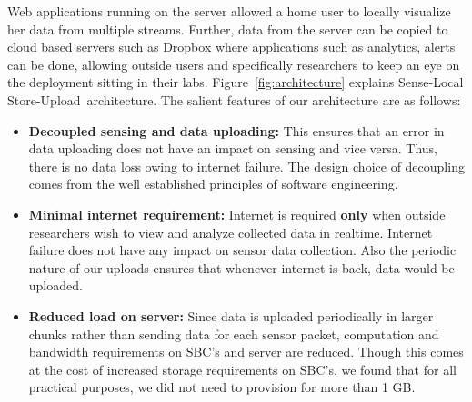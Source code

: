 \documentclass[10pt]{sensys-proc}
\newcommand{\figref}[1]{Figure~\ref{#1}}
\newcommand{\paradigms}{Sense-Local Store-Upload~}
\begin{document}
Web applications running on the server allowed a home user to locally visualize her data from multiple streams. Further, data from the server can be copied to cloud based servers such as Dropbox where applications such as analytics, alerts can be done, allowing outside users and specifically researchers to keep an eye on the deployment sitting in their labs. \figref{fig:architecture} explains \paradigms architecture. The salient features of our architecture are as follows:
\begin{itemize}
\item \textbf{Decoupled sensing and data uploading:} This ensures that an error in data uploading does not have an impact on sensing and vice versa. Thus, there is no data loss owing to internet failure. The design choice of decoupling comes from the well established principles of software engineering.
\item \textbf{Minimal internet requirement:} Internet is required \textbf{only} when outside researchers wish to view and analyze collected data in realtime. Internet failure does not have any impact on sensor data collection. Also the periodic nature of our uploads ensures that whenever internet is back, data would be uploaded.
\item \textbf{Reduced load on server:} Since data is uploaded periodically in larger chunks rather than sending data for each sensor packet, computation and bandwidth requirements on SBC's and server are reduced. Though this comes at the cost of increased storage requirements on SBC's, we found that for all practical purposes, we did not need to provision for more than 1 GB.
\end{itemize}
\end{document}
